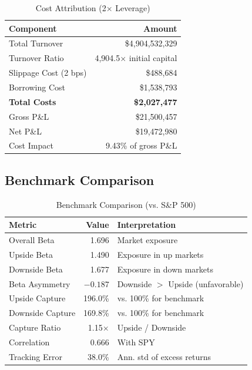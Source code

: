 \documentclass[12pt,a4paper]{article}
\theoremstyle{definition}
\begin{document}
\begin{table}[H]
\centering
\caption{Cost Attribution (2$\times$ Leverage)}
\label{tab:costs}
\begin{tabular}{lr}
\toprule
\textbf{Component} & \textbf{Amount} \\
\midrule
Total Turnover & \$4,904,532,329 \\
Turnover Ratio & 4,904.5$\times$ initial capital \\
\midrule
Slippage Cost (2 bps) & \$488,684 \\
Borrowing Cost & \$1,538,793 \\
\textbf{Total Costs} & \textbf{\$2,027,477} \\
\midrule
Gross P\&L & \$21,500,457 \\
Net P\&L & \$19,472,980 \\
Cost Impact & 9.43\% of gross P\&L \\
\bottomrule
\end{tabular}
\end{table}

\subsection{Benchmark Comparison}

\begin{table}[H]
\centering
\caption{Benchmark Comparison (vs. S\&P 500)}
\label{tab:benchmark}
\begin{tabular}{lrl}
\toprule
\textbf{Metric} & \textbf{Value} & \textbf{Interpretation} \\
\midrule
Overall Beta & 1.696 & Market exposure \\
Upside Beta & 1.490 & Exposure in up markets \\
Downside Beta & 1.677 & Exposure in down markets \\
Beta Asymmetry & $-0.187$ & Downside $>$ Upside (unfavorable) \\
\midrule
Upside Capture & 196.0\% & vs. 100\% for benchmark \\
Downside Capture & 169.8\% & vs. 100\% for benchmark \\
Capture Ratio & 1.15$\times$ & Upside / Downside \\
\midrule
Correlation & 0.666 & With SPY \\
Tracking Error & 38.0\% & Ann. std of excess returns \\
\bottomrule
\end{tabular}
\end{table}
\end{document}
